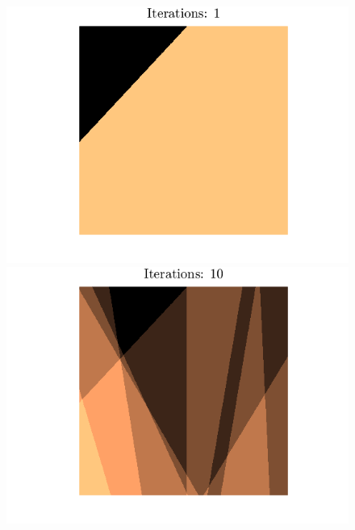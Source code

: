\begin{figure}[h]
    \centering
    \includegraphics[width=\linewidth]{img/lines1.png}
\endminipage\hfill
{}
    \centering
    \includegraphics[width=\linewidth]{img/lines1e1.png}
\endminipage\hfill


\end{figure}

